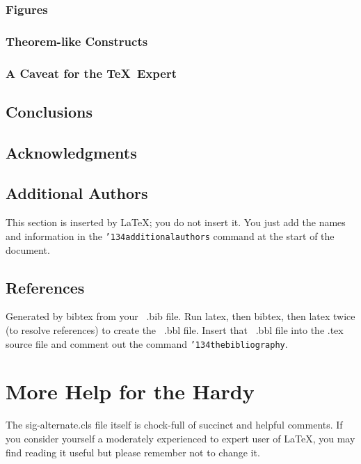 \documentclass{sig-alternate-sigmod08}
\begin{document}
\subsubsection{Figures}
\subsubsection{Theorem-like Constructs}
\subsubsection*{A Caveat for the \TeX\ Expert}
\subsection{Conclusions}
\subsection{Acknowledgments}
\subsection{Additional Authors}
This section is inserted by \LaTeX; you do not insert it.
You just add the names and information in the
\texttt{{\char'134}additionalauthors} command at the start
of the document.
\subsection{References}
Generated by bibtex from your ~.bib file.  Run latex,
then bibtex, then latex twice (to resolve references)
to create the ~.bbl file.  Insert that ~.bbl file into
the .tex source file and comment out
the command \texttt{{\char'134}thebibliography}.
\section{More Help for the Hardy}
The sig-alternate.cls file itself is chock-full of succinct
and helpful comments.  If you consider yourself a moderately
experienced to expert user of \LaTeX, you may find reading
it useful but please remember not to change it.
\balancecolumns %
\end{document}
